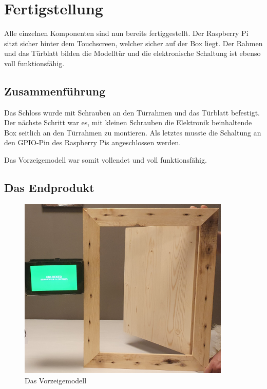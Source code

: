 \chapter{Fertigstellung}
Alle einzelnen Komponenten sind nun bereits fertiggestellt. Der Raspberry Pi sitzt sicher hinter
dem Touchscreen, welcher sicher auf der Box liegt. Der Rahmen und das Türblatt bilden die
Modelltür und die elektronische Schaltung ist ebenso voll funktionsfähig.

\section{Zusammenführung}

Das Schloss wurde mit Schrauben an den Türrahmen und das Türblatt befestigt.
Der nächste Schritt war es, mit kleinen Schrauben die Elektronik beinhaltende Box
seitlich an den Türrahmen zu montieren.
Als letztes musste die Schaltung an den GPIO-Pin des Raspberry Pis angeschlossen werden.

Das Vorzeigemodell war somit vollendet und voll funktionsfähig.

\section{Das Endprodukt}
\begin{figure}[H]
    \begin{center}
        \includegraphics[width=0.9\textwidth]{images/core/fertig.jpg}
        \caption{Das Vorzeigemodell}
    \end{center}
\end{figure}